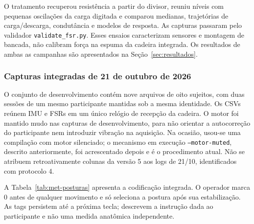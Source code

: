 O tratamento recuperou resistência a partir do divisor, reuniu níveis
com pequenas oscilações da carga digitada e comparou medianas,
trajetórias de carga/descarga, condutância e modelos de resposta.
As capturas passaram pelo validador \texttt{validate\_fsr.py}.
Esses ensaios caracterizam sensores e montagem de bancada, não
calibram força na espuma da cadeira integrada. Os resultados de
ambas as campanhas são apresentados na Seção~\ref{sec:resultados}.

\subsubsection{Capturas integradas de 21 de outubro de 2026}

O conjunto de desenvolvimento contém nove arquivos de oito sujeitos,
com duas sessões de um mesmo participante mantidas sob a mesma
identidade. Os CSVs reúnem IMU e FSRs em um único relógio de recepção
da cadeira. O motor foi mantido mudo nas capturas de desenvolvimento,
para não orientar a autocorreção do participante nem introduzir
vibração na aquisição. Na ocasião, usou-se uma compilação com motor
silenciado; o mecanismo em execução \texttt{--motor-muted}, descrito
anteriormente, foi acrescentado depois e é o procedimento atual.
Não se atribuem retroativamente colunas da versão 5 aos logs de
21/10, identificados com protocolo 4.

A Tabela~\ref{tab:met-posturas} apresenta a codificação integrada.
O operador marca 0 antes de qualquer movimento e só seleciona a
postura após sua estabilização. As tags persistem até a próxima
tecla; descrevem a instrução dada ao participante e não uma medida
anatômica independente.

